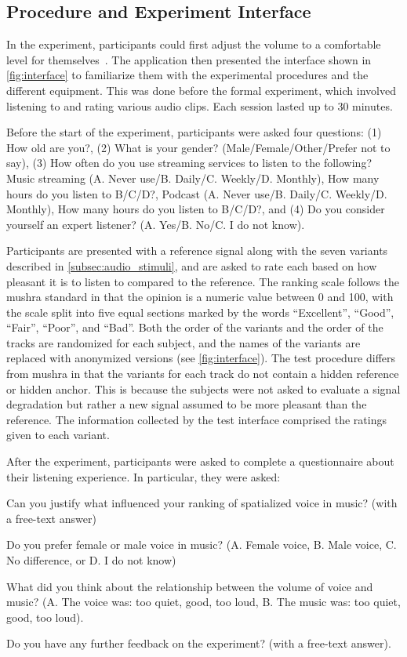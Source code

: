 \documentclass[fleqn]{jaes}
\begin{document}
\subsection{Procedure and Experiment Interface}
In the experiment, participants could first adjust the volume to a comfortable level for themselves~\cite{itu-r-bs.1534-3MethodSubjectiveAssessment2023}. The application then presented the interface shown in \cref{fig:interface} to familiarize them with the experimental procedures and the different equipment. This was done before the formal experiment, which involved listening to and rating various audio clips. Each session lasted up to 30 minutes.

Before the start of the experiment, participants were asked four questions: (1) How old are you?, (2) What is your gender? (Male/Female/Other/Prefer not to say), (3) How often do you use streaming services to listen to the following? Music streaming (A. Never use/B. Daily/C. Weekly/D. Monthly), How many hours do you listen to B/C/D?, Podcast (A. Never use/B. Daily/C. Weekly/D. Monthly), How many hours do you listen to B/C/D?, and (4) Do you consider yourself an expert listener? (A. Yes/B. No/C. I do not know).

Participants are presented with a reference signal along with the seven variants described in \cref{subsec:audio_stimuli}, and are asked to rate each based on how pleasant it is to listen to compared to the reference. The ranking scale follows the \gls{mushra} standard in that the opinion is a numeric value between 0 and 100, with the scale split into five equal sections marked by the words \enquote{Excellent}, \enquote{Good}, \enquote{Fair}, \enquote{Poor}, and \enquote{Bad}. Both the order of the variants and the order of the tracks are randomized for each subject, and the names of the variants are replaced with anonymized versions (see \cref{fig:interface}). The test procedure differs from \gls{mushra} in that the variants for each track do not contain a hidden reference or hidden anchor. This is because the subjects were not asked to evaluate a signal degradation but rather a new signal assumed to be more pleasant than the reference. The information collected by the test interface comprised the ratings given to each variant.

After the experiment, participants were asked to complete a questionnaire about their listening experience. In particular, they were asked:
\begin{enumerate*}
    \item Can you justify what influenced your ranking of spatialized voice in music? (with a free-text answer)
    \item Do you prefer female or male voice in music? (A. Female voice, B. Male voice, C. No difference, or D. I do not know)
    \item What did you think about the relationship between the volume of voice and music? (A. The voice was: too quiet, good, too loud, B. The music was: too quiet, good, too loud).
    \item Do you have any further feedback on the experiment? (with a free-text answer).
\end{enumerate*}
\end{document}
